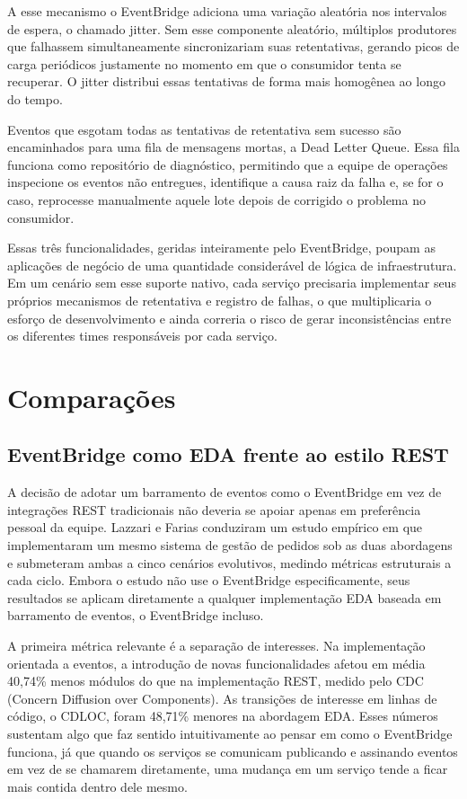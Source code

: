 \documentclass[12pt, a4paper]{article}
\begin{document}
A esse mecanismo o EventBridge adiciona uma variação aleatória nos intervalos de espera, o chamado jitter. Sem esse componente aleatório, múltiplos produtores que falhassem simultaneamente sincronizariam suas retentativas, gerando picos de carga periódicos justamente no momento em que o consumidor tenta se recuperar. O jitter distribui essas tentativas de forma mais homogênea ao longo do tempo.

Eventos que esgotam todas as tentativas de retentativa sem sucesso são encaminhados para uma fila de mensagens mortas, a Dead Letter Queue. Essa fila funciona como repositório de diagnóstico, permitindo que a equipe de operações inspecione os eventos não entregues, identifique a causa raiz da falha e, se for o caso, reprocesse manualmente aquele lote depois de corrigido o problema no consumidor.

Essas três funcionalidades, geridas inteiramente pelo EventBridge, poupam as aplicações de negócio de uma quantidade considerável de lógica de infraestrutura. Em um cenário sem esse suporte nativo, cada serviço precisaria implementar seus próprios mecanismos de retentativa e registro de falhas, o que multiplicaria o esforço de desenvolvimento e ainda correria o risco de gerar inconsistências entre os diferentes times responsáveis por cada serviço.


\section{Comparações}

\subsection{EventBridge como EDA frente ao estilo REST}

A decisão de adotar um barramento de eventos como o EventBridge em vez de integrações REST tradicionais não deveria se apoiar apenas em preferência pessoal da equipe. Lazzari e Farias \cite{lazzari2021} conduziram um estudo empírico em que implementaram um mesmo sistema de gestão de pedidos sob as duas abordagens e submeteram ambas a cinco cenários evolutivos, medindo métricas estruturais a cada ciclo. Embora o estudo não use o EventBridge especificamente, seus resultados se aplicam diretamente a qualquer implementação EDA baseada em barramento de eventos, o EventBridge incluso.

A primeira métrica relevante é a separação de interesses. Na implementação orientada a eventos, a introdução de novas funcionalidades afetou em média 40,74\% menos módulos do que na implementação REST, medido pelo CDC (Concern Diffusion over Components). As transições de interesse em linhas de código, o CDLOC, foram 48,71\% menores na abordagem EDA. Esses números sustentam algo que faz sentido intuitivamente ao pensar em como o EventBridge funciona, já que quando os serviços se comunicam publicando e assinando eventos em vez de se chamarem diretamente, uma mudança em um serviço tende a ficar mais contida dentro dele mesmo.
\end{document}
